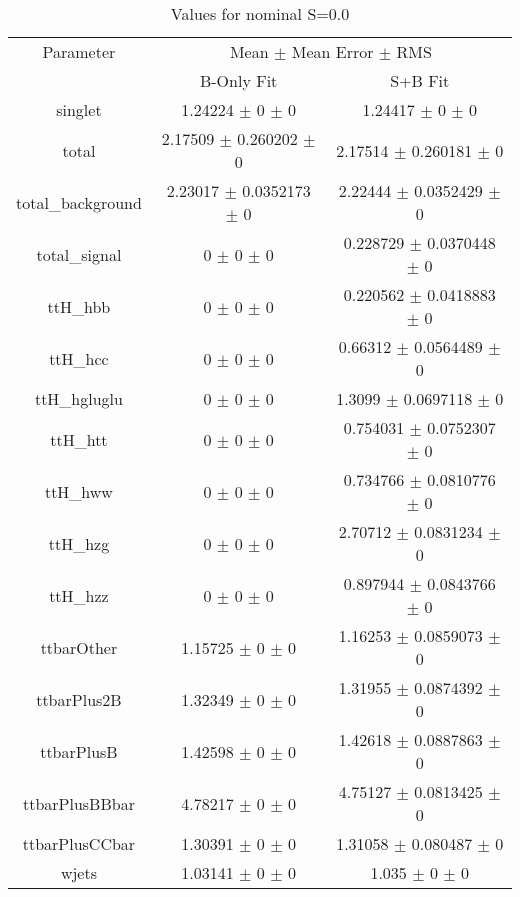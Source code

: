 \begin{table}
\centering
\caption{Values for nominal S=0.0}
\begin{tabular}{ccc}
\toprule
Parameter & \multicolumn{2}{c}{Mean $\pm$ Mean Error $\pm$ RMS}\\
 & B-Only Fit & S+B Fit\\
\midrule
singlet & \num{1.24224} $\pm$ \num{0} $\pm$ \num{0} & \num{1.24417} $\pm$ \num{0} $\pm$ \num{0}\\
total & \num{2.17509} $\pm$ \num{0.260202} $\pm$ \num{0} & \num{2.17514} $\pm$ \num{0.260181} $\pm$ \num{0}\\
total\_background & \num{2.23017} $\pm$ \num{0.0352173} $\pm$ \num{0} & \num{2.22444} $\pm$ \num{0.0352429} $\pm$ \num{0}\\
total\_signal & \num{0} $\pm$ \num{0} $\pm$ \num{0} & \num{0.228729} $\pm$ \num{0.0370448} $\pm$ \num{0}\\
ttH\_hbb & \num{0} $\pm$ \num{0} $\pm$ \num{0} & \num{0.220562} $\pm$ \num{0.0418883} $\pm$ \num{0}\\
ttH\_hcc & \num{0} $\pm$ \num{0} $\pm$ \num{0} & \num{0.66312} $\pm$ \num{0.0564489} $\pm$ \num{0}\\
ttH\_hgluglu & \num{0} $\pm$ \num{0} $\pm$ \num{0} & \num{1.3099} $\pm$ \num{0.0697118} $\pm$ \num{0}\\
ttH\_htt & \num{0} $\pm$ \num{0} $\pm$ \num{0} & \num{0.754031} $\pm$ \num{0.0752307} $\pm$ \num{0}\\
ttH\_hww & \num{0} $\pm$ \num{0} $\pm$ \num{0} & \num{0.734766} $\pm$ \num{0.0810776} $\pm$ \num{0}\\
ttH\_hzg & \num{0} $\pm$ \num{0} $\pm$ \num{0} & \num{2.70712} $\pm$ \num{0.0831234} $\pm$ \num{0}\\
ttH\_hzz & \num{0} $\pm$ \num{0} $\pm$ \num{0} & \num{0.897944} $\pm$ \num{0.0843766} $\pm$ \num{0}\\
ttbarOther & \num{1.15725} $\pm$ \num{0} $\pm$ \num{0} & \num{1.16253} $\pm$ \num{0.0859073} $\pm$ \num{0}\\
ttbarPlus2B & \num{1.32349} $\pm$ \num{0} $\pm$ \num{0} & \num{1.31955} $\pm$ \num{0.0874392} $\pm$ \num{0}\\
ttbarPlusB & \num{1.42598} $\pm$ \num{0} $\pm$ \num{0} & \num{1.42618} $\pm$ \num{0.0887863} $\pm$ \num{0}\\
ttbarPlusBBbar & \num{4.78217} $\pm$ \num{0} $\pm$ \num{0} & \num{4.75127} $\pm$ \num{0.0813425} $\pm$ \num{0}\\
ttbarPlusCCbar & \num{1.30391} $\pm$ \num{0} $\pm$ \num{0} & \num{1.31058} $\pm$ \num{0.080487} $\pm$ \num{0}\\
wjets & \num{1.03141} $\pm$ \num{0} $\pm$ \num{0} & \num{1.035} $\pm$ \num{0} $\pm$ \num{0}\\
\bottomrule
\end{tabular}
\end{table}